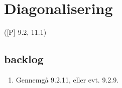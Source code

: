 \newpage
\chapter{Diagonalisering}
([P] 9.2, 11.1)












\section{backlog}
\begin{enumerate}
	\item Gennemgå 9.2.11, eller evt. 9.2.9.
\end{enumerate}

